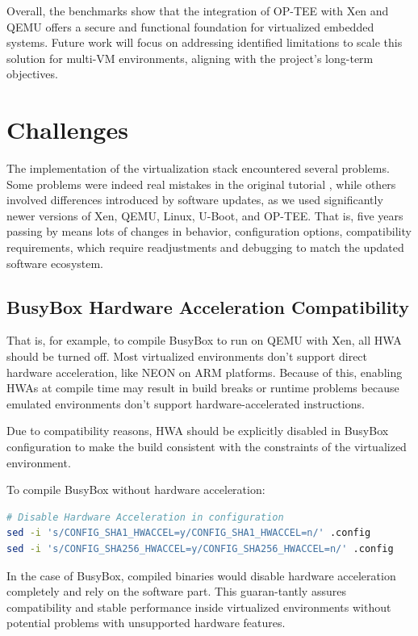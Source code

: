 \documentclass[acmtog]{acmart}
\begin{document}
Overall, the benchmarks show that the integration of OP-TEE with Xen and QEMU offers a secure and functional foundation for virtualized embedded systems. Future work will focus on addressing identified limitations to scale this solution for multi-VM environments, aligning with the project's long-term objectives.



\section{Challenges}
The implementation of the virtualization stack encountered several problems. Some problems were indeed real mistakes in the original tutorial \cite{obrezkov2019xen}, while others involved differences introduced by software updates, as we used significantly newer versions of Xen, QEMU, Linux, U-Boot, and OP-TEE. That is, five years passing by means lots of changes in behavior, configuration options, compatibility requirements, which require readjustments and debugging to match the updated software ecosystem.



\subsection{BusyBox Hardware Acceleration Compatibility}
That is, for example, to compile BusyBox to run on QEMU with Xen, all HWA should be turned off. Most virtualized environments don't support direct hardware acceleration, like NEON on ARM platforms. Because of this, enabling HWAs at compile time may result in build breaks or runtime problems because emulated environments don't support hardware-accelerated instructions.

Due to compatibility reasons, HWA should be explicitly disabled in BusyBox configuration to make the build consistent with the constraints of the virtualized environment.

To compile BusyBox without hardware acceleration:

\begin{lstlisting}[language=bash, caption=Solution to HWA Fault]
# Disable Hardware Acceleration in configuration
sed -i 's/CONFIG_SHA1_HWACCEL=y/CONFIG_SHA1_HWACCEL=n/' .config
sed -i 's/CONFIG_SHA256_HWACCEL=y/CONFIG_SHA256_HWACCEL=n/' .config
\end{lstlisting}


In the case of BusyBox, compiled binaries would disable hardware acceleration completely and rely on the software part. This guaran-tantly assures compatibility and stable performance inside virtualized environments without potential problems with unsupported hardware features.
\end{document}
